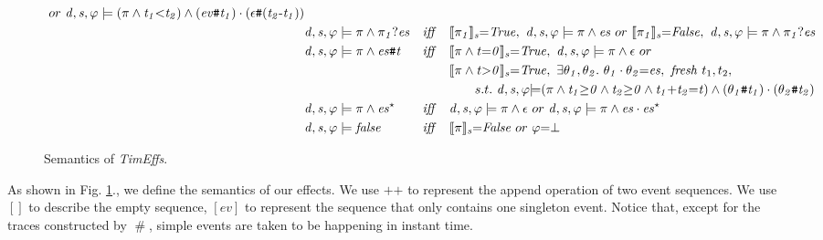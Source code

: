\documentclass[acmsmall,10pt,review]{acmart}
\newcommand{\es}{\theta}
\newcommand{\ev}{ev}
\newcommand{\timedEffects}{\emph{TimEffs}}
\newcommand{\code}[1]{{\tt{\ensuremath{\m{#1}}}}}
\newcommand{\m}{\mathit}
\newcommand{\lappend}{\mathrel{\texttt{++}}}
\newcommand{\mysharp}{{\mathrel{\texttt{\#}}}}
\newcommand\figref[1]{Fig. \textcolor{black}{\ref{#1}}.}
\begin{document}
{\begin{figure}[!ht]
\begin{align*}
\ or\ \code{d, s, \varphi \models {(\pi \wedge t_1 {<}t_2)}  \wedge (\ev\mysharp t_1) \cdot (\epsilon \mysharp  (t_2\text{-}t_1))  } \\
&\code{d, s, \varphi \models {\pi} \wedge \pi_1 ? es}  &\m{iff}\quad & 
\code{\llbracket \pi_1  \rrbracket_{s} {=}  
 {True} }, \ \code{d, s, \varphi \models {\pi}  \wedge es}\ or  \ 
  \code{\llbracket \pi_1 \rrbracket_{s} {=}  
{False} }, 
\  \code{d, s, \varphi \models {\pi} \wedge \pi_1 ? es}\\
&\code{d, s, \varphi \models {\pi}  \wedge es\mysharp  t}  &\m{iff}\quad &
 \code{\llbracket {\pi}  \wedge t {=} 0 \rrbracket_{s} {=}  
 {True} }, \ \code{d, s, \varphi \models {\pi}  \wedge  \epsilon}\ or  \\
& & &  \code{\llbracket {\pi}\wedge t {>} 0 \rrbracket_{s} {=}  
{True} }, 
\  \exists \code{\es_1,\es_2}. \  \code{\es_1  \cdot  \es_2 {=} es}, \  \m{fresh}\ t_1, t_2,\\
&&& \qquad  s.t. \ \code{d, s, \varphi {\models} {(\pi 
 \wedge  t_1{\geq}0 \wedge t_2{\geq}0  \wedge  t_1{+} t_2{=}t)} \wedge 
(\es_1\mysharp t_1)  \cdot  (\es_2\mysharp t_2) } \\
&\code{d, s, \varphi \models {\pi}\wedge es^\star}  &\m{iff}\quad & 
\code{d, s, \varphi \models {\pi}  \wedge  \epsilon}\ or \ 
\code{d, s, \varphi \models {\pi}  \wedge es  \cdot  es^\star}\\
& \code{d, s, \varphi \models false}  &\m{iff}\quad &
 \code{\llbracket {\pi}  \rrbracket_{s} {=} {False} } \ or \ \code{\varphi {=} \bot }
\end{align*}
  \vspace{-2mm}
\caption{Semantics of \timedEffects.}
\label{fig:Sementic}
\vspace{-2mm}
\end{figure}


As shown in \figref{fig:Sementic}, we define the semantics of our effects. 
We use $\lappend$ to represent the append operation of two event sequences. 
We use $[]$ to describe the empty sequence, \code{[\ev]} to represent 
the sequence that only contains one singleton event. 
Notice that, except for the traces constructed by \code{\mysharp}, simple events 
are taken to be happening in instant time. 


}
\end{document}
